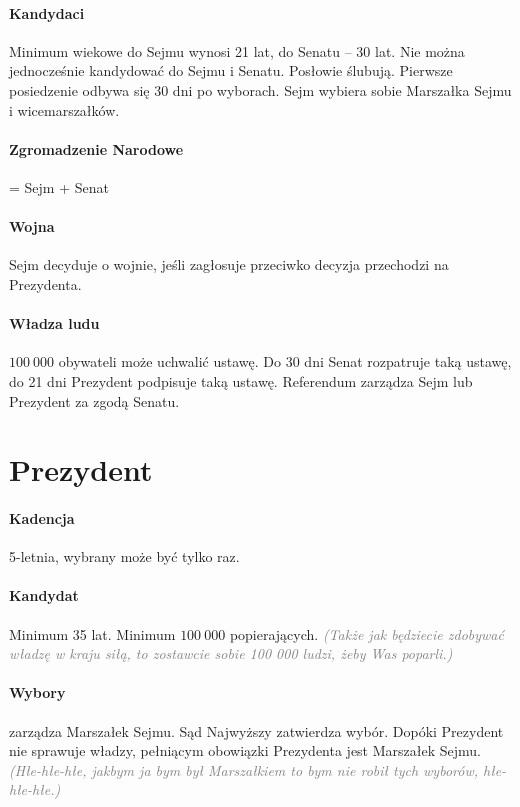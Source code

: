 \documentclass [a4paper, 12pt, oneside]{article}
\newcommand{\comment}[1]{\textcolor{Gray}{\textsf{\emph{(#1)}}}}
\begin{document}
    \paragraph{Kandydaci} Minimum wiekowe do Sejmu wynosi 21 lat, do Senatu -- 30 lat. Nie można jednocześnie kandydować do Sejmu i Senatu. Posłowie ślubują. Pierwsze posiedzenie odbywa się 30 dni po wyborach. Sejm wybiera sobie Marszałka Sejmu i wicemarszałków.

    \paragraph{Zgromadzenie Narodowe} = Sejm + Senat

    \paragraph{Wojna} Sejm decyduje o wojnie, jeśli zagłosuje przeciwko decyzja przechodzi na Prezydenta.

    \paragraph{Władza ludu} $100~000$ obywateli może uchwalić ustawę. Do 30 dni Senat rozpatruje taką ustawę, do 21 dni Prezydent podpisuje taką ustawę. Referendum zarządza Sejm lub Prezydent za zgodą Senatu.

\section{Prezydent} %
\label{sec:prezydent}
    \paragraph{Kadencja} 5-letnia, wybrany może być tylko raz.

    \paragraph{Kandydat} Minimum 35 lat. Minimum $100~000$ popierających. \comment{Także jak będziecie zdobywać władzę w kraju siłą, to zostawcie sobie 100 000 ludzi, żeby Was poparli.}

    \paragraph{Wybory} zarządza Marszałek Sejmu. Sąd Najwyższy zatwierdza wybór. Dopóki Prezydent nie sprawuje władzy, pełniącym obowiązki Prezydenta jest Marszałek Sejmu. \comment{Hłe-hłe-hłe, jakbym ja bym był Marszałkiem to bym nie robił tych wyborów, hłe-hłe-hłe.}
\end{document}
